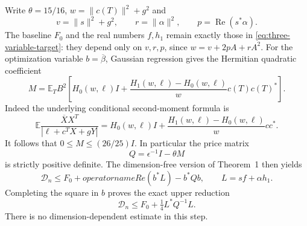 Write $\theta=15/16$, $w=\|c(T)\|^2+g^2$ and
\[
 v=\|s\|^2+g^2,\qquad r=\|\alpha\|^2,\qquad
 p=\operatorname{Re}(s^*\alpha).
\]
The baseline $F_0$ and the real numbers $f,h_1$ remain exactly those in
\eqref{eq:three-variable-target}: they depend only on $v,r,p$, since
$w=v+2pA+rA^2$.  For the optimization variable $b=\overline\beta$,
Gaussian regression gives the Hermitian quadratic coefficient
\begin{equation}
 M=\mathbb E_T B^2\left[
 H_0(w,\ell)I+
 \frac{H_1(w,\ell)-H_0(w,\ell)}w c(T)c(T)^*\right].
 \label{eq:vector-M}
\end{equation}
Indeed the underlying conditional second-moment formula is
\[
 \mathbb E\frac{\overline X X^T}{|\ell+c^TX+gY|}
 =H_0(w,\ell)I+
   \frac{H_1(w,\ell)-H_0(w,\ell)}w cc^*.
\]
It follows that $0\le M\le(26/25)I$.  In particular the price matrix
\[
 Q=\epsilon^{-1}I-\theta M
\]
is strictly positive definite.  The dimension-free version of Theorem~1
then yields
\[
 \mathcal D_n\le F_0+operatorname{Re}(b^*L)-b^*Qb,
 \qquad L=sf+\alpha h_1.
\]
Completing the square in $b$ proves the exact upper reduction
\begin{equation}
 \boxed{\qquad
 \mathcal D_n\le F_0+\tfrac14L^*Q^{-1}L.
 \qquad}
 \label{eq:vector-upper}
\end{equation}
There is no dimension-dependent estimate in this step.

